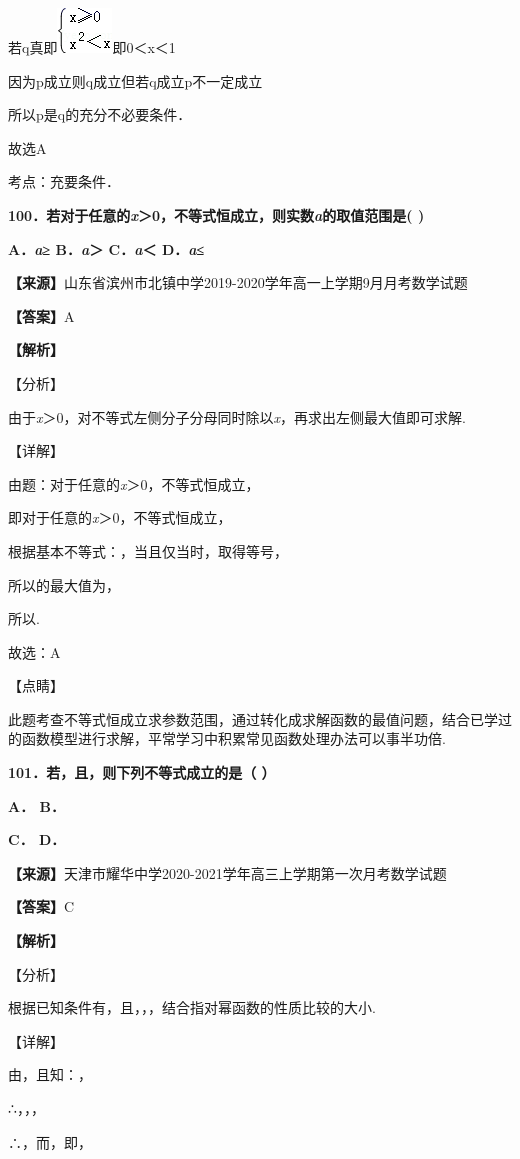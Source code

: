 \documentclass[
]{article}
\begin{document}
若q真即\includegraphics{Fig//media/image1032.png}即0＜x＜1

因为p成立则q成立但若q成立p不一定成立

所以p是q的充分不必要条件．

故选A

考点：充要条件．

\textbf{100．若对于任意的\emph{x}＞0，不等式恒成立，则实数\emph{a}的取值范围是(
)}

\textbf{A．\emph{a}≥ B．\emph{a}＞ C．\emph{a}＜ D．\emph{a}≤}

\textbf{【来源】}山东省滨州市北镇中学2019-2020学年高一上学期9月月考数学试题

\textbf{【答案】}A

\textbf{【解析】}

【分析】

由于\emph{x}＞0，对不等式左侧分子分母同时除以\emph{x}，再求出左侧最大值即可求解.

【详解】

由题：对于任意的\emph{x}＞0，不等式恒成立，

即对于任意的\emph{x}＞0，不等式恒成立，

根据基本不等式：，当且仅当时，取得等号，

所以的最大值为，

所以.

故选：A

【点睛】

此题考查不等式恒成立求参数范围，通过转化成求解函数的最值问题，结合已学过的函数模型进行求解，平常学习中积累常见函数处理办法可以事半功倍.

\textbf{101．若，且，则下列不等式成立的是（ ）}

\textbf{A． B．}

\textbf{C． D．}

\textbf{【来源】}天津市耀华中学2020-2021学年高三上学期第一次月考数学试题

\textbf{【答案】}C

\textbf{【解析】}

【分析】

根据已知条件有，且，，，结合指对幂函数的性质比较的大小.

【详解】

由，且知：，

∴，，，

∴，而，即，
\end{document}
